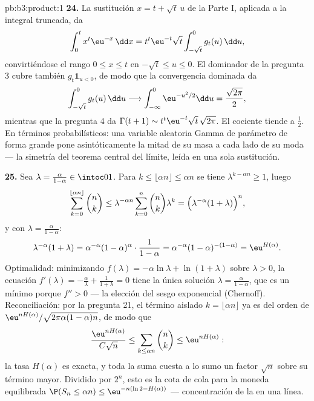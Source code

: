 \begin{solution}{pb:b3:product:1}
\textbf{24.} La sustitución $x = t + \sqrt t\,u$ de la Parte I, aplicada
a la integral truncada, da
\[
\int_0^{t} x^{t}\eu^{-x}\,\dd x
= t^{t}\eu^{-t}\sqrt t\int_{-\sqrt t}^{0} g_t(u)\,\dd u ,
\]
convirtiéndose el rango $0 \leq x \leq t$ en $-\sqrt t \leq u \leq
0$. El dominador de la pregunta 3 cubre también $g_t\mathbf 1_{u < 0}$,
de modo que la convergencia dominada da
\[
\int_{-\sqrt t}^{0}g_t(u)\,\dd u \longrightarrow
\int_{-\infty}^{0}\eu^{-u^2/2}\dd u = \frac{\sqrt{2\pi}}2 ,
\]
mientras que la pregunta 4 da $\Gamma(t+1) \sim
t^t\eu^{-t}\sqrt t\,\sqrt{2\pi}$. El cociente tiende a $\frac12$. En
términos probabilísticos: una variable aleatoria Gamma de parámetro de
forma grande pone asintóticamente la mitad de su masa a cada lado de su
moda --- la simetría del teorema central del límite, leída en una sola
sustitución.

\textbf{25.} Sea $\lambda = \frac{\alpha}{1-\alpha} \in
\intoc01$. Para $k \leq \lfloor\alpha n\rfloor \leq \alpha n$ se tiene
$\lambda^{k - \alpha n} \geq 1$, luego
\[
\sum_{k=0}^{\lfloor\alpha n\rfloor}\binom nk
\leq \lambda^{-\alpha n}\sum_{k=0}^{n}\binom nk\lambda^{k}
= \Bigl(\lambda^{-\alpha}(1 + \lambda)\Bigr)^{n},
\]
y con $\lambda = \frac\alpha{1-\alpha}$:
\[
\lambda^{-\alpha}(1+\lambda)
= \alpha^{-\alpha}(1-\alpha)^{\alpha}\cdot\frac1{1-\alpha}
= \alpha^{-\alpha}(1-\alpha)^{-(1-\alpha)}
= \eu^{H(\alpha)} .
\]
Optimalidad: minimizando $f(\lambda) = -\alpha\ln\lambda +
\ln(1+\lambda)$ sobre $\lambda > 0$, la ecuación $f'(\lambda)
= -\frac\alpha\lambda + \frac1{1+\lambda} = 0$ tiene la única solución
$\lambda = \frac\alpha{1-\alpha}$, que es un mínimo porque $f'' > 0$ ---
la elección del sesgo exponencial (Chernoff). Reconciliación: por la
pregunta 21, el término aislado $k =
\lfloor\alpha n\rfloor$ ya es del orden de
$\eu^{nH(\alpha)}/\sqrt{2\pi\alpha(1-\alpha)n}$, de modo que
\[
\frac{\eu^{nH(\alpha)}}{C\sqrt n} \leq
\sum_{k\leq\alpha n}\binom nk \leq \eu^{nH(\alpha)} :
\]
la tasa $H(\alpha)$ es exacta, y toda la suma cuesta a lo sumo un factor
$\sqrt n$ sobre su término mayor. Dividido por $2^n$, esto es la cota de
cola para la moneda equilibrada $\P(S_n \leq \alpha n) \leq
\eu^{-n(\ln2 - H(\alpha))}$ --- concentración de la
 en una línea.
\end{solution}
